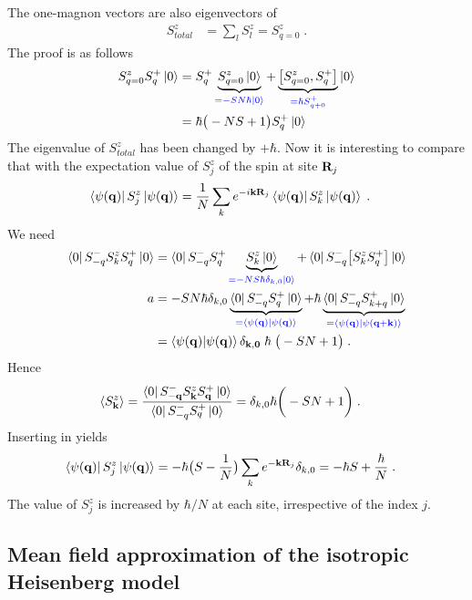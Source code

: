 The one-magnon vectors are also eigenvectors of 
%
\begin{align*}
S^{z}_{total} &= \sum_{l} S_{l}^{z} = S^{z}_{q=0}\;. 
\end{align*}
%
The proof is as follows
%
\begin{align*}
S^{z}_{q=0} S_{q}^{+} \ket{0} &=S_{q}^{+} \underbrace{
S^{z}_{q=0}  \ket{0} 
}_{\color{blue} = -S N\hbar  \ket{0}}
+\underbrace{
\big[S^{z}_{q=0}, S_{q}^{+} \big]
}_{\color{blue} = \hbar S^{+}_{q+0}}\ket{0} \\
&=\hbar\big( -N S +1 \big) S_{q}^{+}\ket{0}
\end{align*}
%
The eigenvalue of $S^{z}_{total}$ has been changed by $+\hbar $. Now it is interesting to compare that with the expectation value of $S_{j}^{z}$ of the spin at site $\mathbf R_{j}$
%
\begin{align}\label{eq:mfa:aux1}
\bra{\psi(\mathbf q)} S_{j}^{z} \ket{\psi(\mathbf q)} &= \frac{1}{N}
\sum_{k} e^{-i\mathbf k \mathbf R_{j}}
\bra{\psi(\mathbf q)} S_{k}^{z} \ket{\psi(\mathbf q)}\;.
\end{align}
%
We need
%
\begin{align*}
\bra{0} S^{-}_{-q} S_{k}^{z} S^{+}_{q}\ket{0}
&=\bra{0} S^{-}_{-q} S^{+}_{q}\underbrace{
S_{k}^{z} \ket{0}
}_{\color{blue} = -N S\hbar \delta_{k,0}\ket{0}}
+\bra{0} S^{-}_{-q} \big[S_{k}^{z} S^{+}_{q}\big]\ket{0}\\
a &= -S N \hbar \delta_{k,0} \underbrace{
\bra{0} S^{-}_{-q} S^{+}_{q}\ket{0}
}_{\color{blue} = \braket{\psi(\mathbf q)}{\psi(\mathbf q)}}
+\hbar \underbrace{
\bra{0} S^{-}_{-q}  S^{+}_{k+q}\ket{0}
}_{\color{blue} = \braket{\psi(\mathbf q)}{\psi(\mathbf q +\mathbf k)}}\\
&= \braket{\psi(\mathbf q)}{\psi(\mathbf q)}  \delta_{\mathbf k,\mathbf 0}\;\hbar\;
\big( -SN + 1 \big)\;.
\end{align*}
%
Hence
\begin{align*}
\left\langle S^{z}_{\mathbf k}\right\rangle = \frac{\bra{0} S^{-}_{-\mathbf q} S_{\mathbf k}^{z} S^{+}_{\mathbf q}\ket{0}}{\bra{0} S^{-}_{-q} S^{+}_{q} \ket{0}}
&=\delta_{k,0} \hbar \bigg( -S N 
+1 \bigg)\;.
\end{align*}
%
Inserting in  yields
%
\begin{align*}
\bra{\psi(\mathbf q)} S_{j}^{z} \ket{\psi(\mathbf q)} &= -\hbar  \big(S-\frac{1}{N}  \big)
\sum_{k} e^{-\mathbf k \mathbf R_{j}}
\delta_{k,0} = -\hbar S + \frac{\hbar}{N}\;.
\end{align*}
%
The value of $S_{j}^{z}$ is increased by $\hbar /N$ at each site, irrespective of the index $j$.

\subsection{Mean field approximation of the isotropic Heisenberg model}


